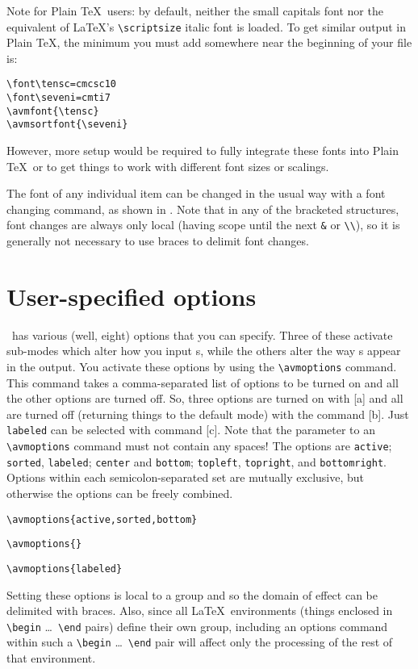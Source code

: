 Note for Plain \TeX\ users: by default, neither the small capitals font nor
the equivalent of \LaTeX's \verb+\scriptsize+ italic font is loaded.
To get similar output in Plain \TeX, the minimum you must add somewhere
near the beginning of your file is:
\begin{example}
\begin{verbatim}
\font\tensc=cmcsc10
\font\seveni=cmti7
\avmfont{\tensc}
\avmsortfont{\seveni}
\end{verbatim}
\end{example}
%
However, more setup would be required to fully integrate these fonts into
Plain \TeX\ or to get things to work with different font sizes or scalings.

The font of any individual item can be changed in the usual way with a font
changing command, as shown in .
Note that in any of the bracketed structures, font
changes are always only local (having scope until the next \verb+&+ or
\verb+\\+), so it is generally not necessary to use braces to delimit
font changes.

\section{User-specified options}

\av\ has various (well, eight) options that you can specify.  Three of these
activate sub-modes which alter how you input {\AVM}s, while the others
alter the way {\AVM}s appear in the output.  You
activate these options by using the \verb+\avmoptions+ command.  This
command takes a comma-separated list of options to be turned on and all the
other options are turned off.  So, three options are turned on
with [a] and all are turned off (returning things to the default
mode) with the command [b].  Just \verb+labeled+ can be
selected with command [c].   Note that the parameter to an
\verb+\avmoptions+ command must not contain any spaces!  The options
are \verb+active+; \verb+sorted+, \verb+labeled+; \verb+center+ and
\verb+bottom+;  \verb+topleft+, \verb+topright+, and \verb+bottomright+.
Options within each semicolon-separated set are mutually exclusive, but
otherwise the options can be freely combined.
%
\begin{examples}
\item \verb+\avmoptions{active,sorted,bottom}+
\item \verb+\avmoptions{}+
\item \verb+\avmoptions{labeled}+
\end{examples}
%
Setting these options is local to a group and so the domain of effect can
be delimited with braces.  Also, since all \LaTeX\ environments (things
enclosed in \verb+\begin+ \ldots\ \verb+\end+ pairs) define their
own group, including an options command within such a \verb+\begin+ \ldots\
\verb+\end+ pair will affect only the processing of the rest of that
environment. 

